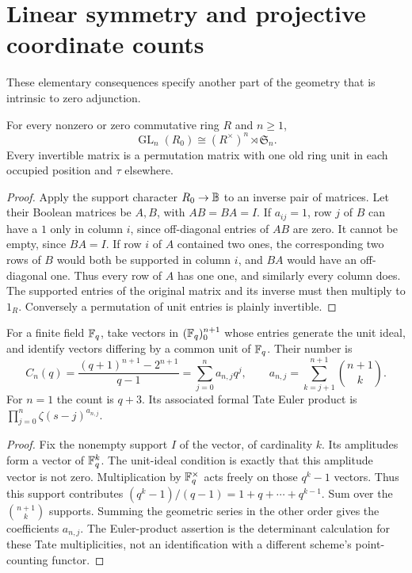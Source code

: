 \documentclass[11pt]{article}
\theoremstyle{definition}\newtheorem{definition}[theorem]{Definition}
\begin{document}


\section{Linear symmetry and projective coordinate counts}\label{sec:linear}
These elementary consequences specify another part of the geometry that is intrinsic to zero adjunction.

\begin{proposition}\label{prop:gl}
For every nonzero or zero commutative ring $R$ and $n\ge1$,
\[
 \operatorname{GL}_n(R_0)\cong(R^\times)^n\rtimes\mathfrak S_n.
\]
Every invertible matrix is a permutation matrix with one old ring unit in each occupied position and $\tau$ elsewhere.
\end{proposition}
\begin{proof}
Apply the support character $R_0\to\mathbb B$ to an inverse pair of matrices. Let their Boolean matrices be $A,B$, with $AB=BA=I$. If $a_{ij}=1$, row $j$ of $B$ can have a $1$ only in column $i$, since off-diagonal entries of $AB$ are zero. It cannot be empty, since $BA=I$. If row $i$ of $A$ contained two ones, the corresponding two rows of $B$ would both be supported in column $i$, and $BA$ would have an off-diagonal one. Thus every row of $A$ has one one, and similarly every column does. The supported entries of the original matrix and its inverse must then multiply to $1_R$. Conversely a permutation of unit entries is plainly invertible.
\end{proof}

\begin{proposition}\label{prop:points}
For a finite field $\mathbb F_q$, take vectors in $(\mathbb F_q)_0^{n+1}$ whose entries generate the unit ideal, and identify vectors differing by a common unit of $\mathbb F_q$. Their number is
\[
 C_n(q)=\frac{(q+1)^{n+1}-2^{n+1}}{q-1}
       =\sum_{j=0}^{n}a_{n,j}q^j,
 \qquad a_{n,j}=\sum_{k=j+1}^{n+1}\binom{n+1}{k}.
\]
For $n=1$ the count is $q+3$. Its associated formal Tate Euler product is $\prod_{j=0}^{n}\zeta(s-j)^{a_{n,j}}$.
\end{proposition}
\begin{proof}
Fix the nonempty support $I$ of the vector, of cardinality $k$. Its amplitudes form a vector of $\mathbb F_q^k$. The unit-ideal condition is exactly that this amplitude vector is not zero. Multiplication by $\mathbb F_q^\times$ acts freely on those $q^k-1$ vectors. Thus this support contributes $(q^k-1)/(q-1)=1+q+\cdots+q^{k-1}$. Sum over the $\binom{n+1}{k}$ supports. Summing the geometric series in the other order gives the coefficients $a_{n,j}$. The Euler-product assertion is the determinant calculation for these Tate multiplicities, not an identification with a different scheme's point-counting functor.
\end{proof}
\end{document}

